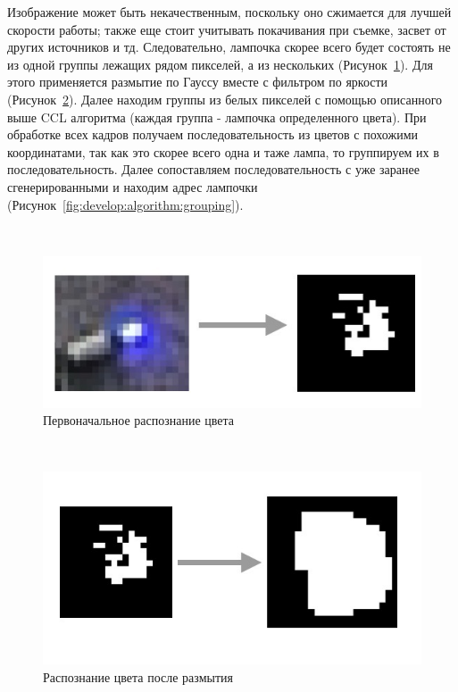 Изображение может быть некачественным, поскольку оно сжимается для лучшей скорости работы; также еще стоит учитывать покачивания при съемке, засвет от других источников и тд. Следовательно, лампочка скорее всего будет состоять не из одной группы лежащих рядом пикселей, а из нескольких (Рисунок~\ref{fig:develop:algorithm:toBlackWhite}). Для этого применяется размытие по Гауссу вместе с фильтром по яркости (Рисунок~\ref{fig:develop:algorithm:blurring}). Далее находим группы из белых пикселей с помощью описанного выше CCL алгоритма (каждая группа - лампочка определенного цвета). При обработке всех кадров получаем последовательность из цветов с похожими координатами, так как это скорее всего одна и таже лампа, то группируем их в последовательность. Далее сопоставляем последовательность с уже заранее сгенерированными и находим адрес лампочки (Рисунок~\ref{fig:develop:algorithm:grouping}).

~
\begin{figure}[H]
\centering
	\includegraphics[scale=0.5]{figures/calibration_toBlackWhite.jpg}
	\caption{Первоначальное распознание цвета}
	\label{fig:develop:algorithm:toBlackWhite}
\end{figure}

~
\begin{figure}[H]
\centering
	\includegraphics[scale=0.5]{figures/calibration_blurring.jpg}
	\caption{Распознание цвета после размытия}
	\label{fig:develop:algorithm:blurring}
\end{figure}

